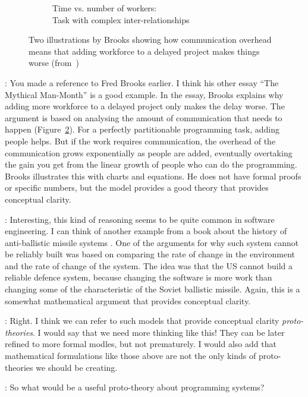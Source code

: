 \documentclass[runningheads]{llncs}
\newcommand{\T}{Tomas}
\newcommand{\J}{Joel}
\newcommand{\says}[2][gg]{\vspace{0.5em}\noindent\hangindent=0.5cm{\textsc{#1}}: #2}
\begin{document}
\begin{figure}[t]
\begin{subfigure}{0.49\textwidth}
   \caption{Time vs. number of workers:\\Task with complex inter-relationships}
   \label{fig:syy}
\end{subfigure}
\caption{Two illustrations by Brooks showing how communication overhead means that adding workforce to a delayed project makes things worse (from~\cite{brooks-1975-manmonth})}
\label{fig:mm}
\vspace{-0.5em}
\end{figure}

\says[\J]{You made a reference to Fred Brooks earlier. I think his other essay ``The Mythical Man-Month'' \cite{brooks-1975-manmonth} is a good example. In the essay, Brooks explains why adding more workforce to a delayed project only makes the delay worse. The argument is based on analysing the amount of communication that needs to happen (Figure~\ref{fig:mm}). For a perfectly partitionable programming task, adding people helps. But if the work requires communication, the overhead of the communication grows exponentially as people are added, eventually overtaking the gain you get from the linear growth of people who can do the programming. Brooks illustrates this with charts and equations. He does not have formal proofs or specific numbers, but the model provides a good theory that provides conceptual clarity.}

\says[\T]{Interesting, this kind of reasoning seems to be quite common in software engineering. I can think of another example from a book about the history of anti-ballistic missile systems \cite{slayton-2013-arguments}. One of the arguments for why such system cannot be reliably built was based on comparing the rate of change in the environment and the rate of change of the system. The idea was that the US cannot build a reliable defence system, because changing the software is more work than changing some of the characteristic of the Soviet ballistic missile. Again, this is a somewhat mathematical argument that provides conceptual clarity.}

\says[\J]{Right. I think we can refer to such models that provide conceptual clarity \emph{proto-theories}. I would say that we need more thinking like this! They can be later refined to more formal modles, but not prematurely. I would also add that mathematical formulations like those above are not the only kinds of proto-theories we should be creating.}

\says[\T]{So what would be a useful proto-theory about programming systems?}
\end{document}
